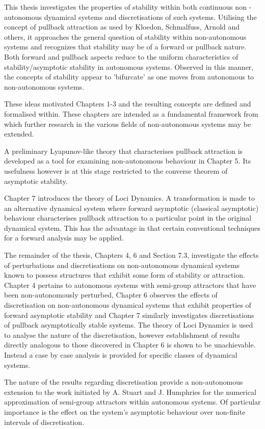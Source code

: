 \documentclass[11pt]{book}
\begin{document}
This thesis investigates the properties of stability within both continuous
non - autonomous dynamical systems  and discretisations of such systems.
Utilising the concept of pullback attraction as used by Kloedon, Schmalfuss,
Arnold and others, it approaches the general question of stability within
non-autonomous systems and recognizes that stability may be of a forward or
pullback nature. Both forward and pullback aspects reduce to the uniform
characteristics of stability/asymptotic stability in autonomous systems.
Observed in this manner, the concepts of stability appear to 'bifurcate' as one
moves from autonomous to non-autonomous systems.

These ideas motivated Chapters 1-3 and the resulting concepts are defined and
formalised within. These chapters are intended as a fundamental framework from
which further research in the various fields of non-autonomous systems
may be extended.

A preliminary Lyapunov-like theory that characterises pullback
attraction is developed as a tool for examining non-autonomous behaviour in
Chapter 5. Its usefulness however is at this stage restricted
to the converse theorem of asymptotic stability.

Chapter 7 introduces the theory of Loci Dynamics. A transformation
is made to an alternative dynamical system where forward
asymptotic (classical asymptotic) behaviour characterises pullback
attraction to a particular point in the original dynamical system.
This has the advantage in that certain conventional techniques for
a forward analysis may be applied.

The remainder of the thesis, Chapters 4, 6 and Section 7.3, investigate the
effects of perturbations and discretisations on non-autonomous dynamical systems
known to possess structures that exhibit some form of stability or attraction.
Chapter 4 pertains to autonomous systems with semi-group attractors that have
been non-autonomously perturbed, Chapter 6 observes the effects of
discretisation on non-autonomous dynamical systems that exhibit properties of
forward asymptotic stability and Chapter 7 similarly investigates
discretisations of pullback asymptotically stable
systems. The theory of Loci Dynamics is used to analyse the nature of the
discretisation, however establishment of results directly analogous to those
discovered in Chapter 6 is shown to be unachievable. Instead a case by case
analysis is provided for specific classes of dynamical systems.

The nature of the results regarding discretisation provide a non-autonomous
extension to the work initiated by A. Stuart and J. Humphries
for the numerical approximation of semi-group attractors within autonomous
systems. Of particular importance is the effect on the system's asymptotic
behaviour over non-finite intervals of discretisation.
\end{document}
